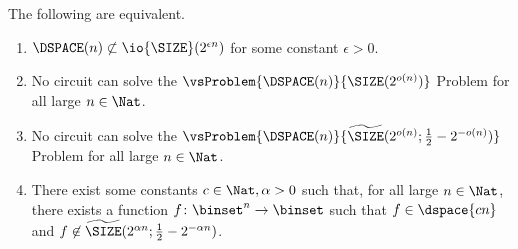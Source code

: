 \documentclass{toc}
\begin{document}
\begin{proposition}
  \label{prop_NonproperKS}
  The following are equivalent.
  \begin{enumerate}
    \item
          \label{item_DSPACElowerbound}
          $\DSPACE(n) \not\subset \io{\SIZE}(2^{\epsilon n})$ for some constant  $\epsilon> 0$.
    \item
          \label{item_NondisjointDSPACESIZE}
          No circuit can solve
          the $\vsProblem{\DSPACE(n)}{{\SIZE}(2^{o(n)})}$ Problem for all large $n \in \Nat$.
    \item
          \label{item_NondisjointDSPACEApproxSIZE}
          No circuit can solve
          the $\vsProblem{\DSPACE(n)}{\widetilde{\SIZE}(2^{o(n)}; \frac{1}{2} - 2^{-o(n)})}$ Problem for all large $n \in \Nat$.
    \item
          \label{item_NondisjointDSPACEApproxSIZERestated}
          There exist some constants $c \in \Nat, \alpha > 0$ such that,
          for all large $n \in \Nat$,
          there exists a function $f \colon \binset^n \to \binset$ such that
          $f \in \dspace{c n}$
          and $f \not\in \widetilde{\SIZE}(2^{\alpha n}; \frac{1}{2} - 2^{-\alpha n})$.
  \end{enumerate}
\end{proposition}
\end{document}
